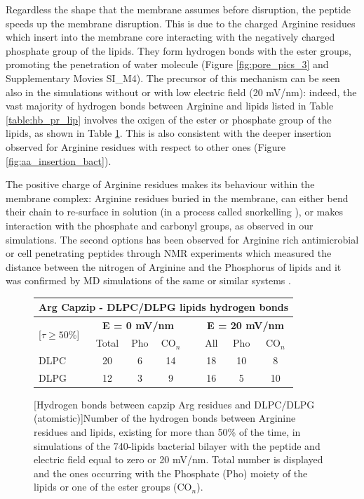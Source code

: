 Regardless the shape that the membrane assumes before disruption, the peptide speeds up the membrane disruption. This is due to the charged Arginine residues which insert into the membrane core interacting with the negatively charged phosphate group of the lipids. They form hydrogen bonds with the ester groups, promoting the penetration of water molecule (Figure \ref{fig:pore_pics_3} and Supplementary Movies SI\_M4).
%
The precursor of this mechanism can be seen also in the simulations without or with low electric field (20 mV/nm): indeed, the vast majority of hydrogen bonds between Arginine and lipids listed in Table \ref{table:hb_pr_lip} involves the oxigen of the ester or phosphate group of the lipids, as shown in Table \ref{table:hb_ester}. This is also consistent with the deeper insertion observed for Arginine residues with respect to other ones (Figure \ref{fig:aa_insertion_bact}).

The positive charge of Arginine residues makes its behaviour within the membrane complex: Arginine residues buried in the membrane, can either bend their chain to re-surface in solution (in a process called snorkelling \citep{Liang2005,Ulmschneider2017arg,Ojemalm2016}), or makes interaction with the phosphate and carbonyl groups, as observed in our simulations. The second options has been observed for Arginine rich antimicrobial or cell penetrating peptides through NMR experiments which measured the distance between the nitrogen of Arginine and the Phosphorus of lipids \citep{Tang2007,Jobin2019} and it was confirmed by MD simulations of the same or similar systems \citep{Herce2009,Jobin2019}.


\begin{figure}[t!]
\centering
 \def\arraystretch{1.6}
\begin{tabular}{lcccccccc}
\multicolumn{9}{c}{\textbf{Arg Capzip - DLPC/DLPG lipids hydrogen bonds}} \\
\hline
\multicolumn{2}{l}{\multirow{2}{*}{[$\tau \ge 50$\%]}} & \multicolumn{3}{c}{\textbf{E = 0 mV/nm}} && \multicolumn{3}{c}{\textbf{E = 20 mV/nm}} \\
\cline{3-9}
&& Total & Pho & CO$_n$ && All & Pho & CO$_n$ \\ 
\hline
DLPC && 20 & 6 & 14 && 18 & 10 & 8 \\
DLPG && 12 & 3 & 9 && 16 & 5 & 10 \\
\hline
 \end{tabular}
[Hydrogen bonds between capzip Arg residues and DLPC/DLPG (atomistic)]{Number of the hydrogen bonds between Arginine residues and lipids, existing for more than 50\% of the time, in simulations of the 740-lipids bacterial bilayer with the peptide and electric field equal to zero or 20 mV/nm. Total number is displayed and the ones occurring with the Phosphate (Pho) moiety of the lipids or one of the ester groups (CO$_n$).}
\label{table:hb_ester}
\end{figure}

